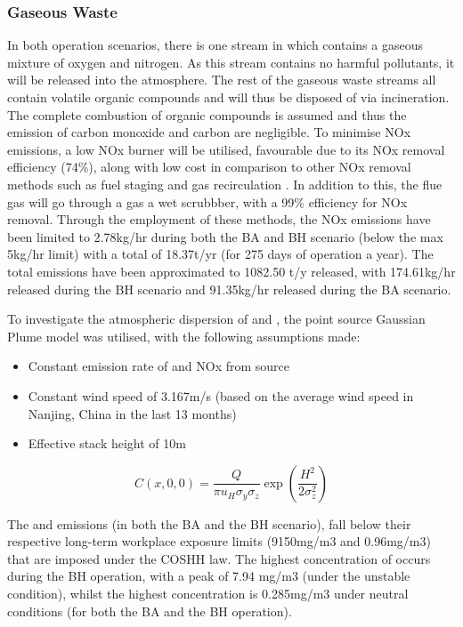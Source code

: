 
\subsubsection{Gaseous Waste}

In both operation scenarios, there is one stream in which contains a gaseous mixture of oxygen and nitrogen. As this stream contains no harmful pollutants, it will be released into the atmosphere. The rest of the gaseous waste streams all contain volatile organic compounds and will thus be disposed of via incineration. The complete combustion of organic compounds is assumed and thus the emission of carbon monoxide and carbon are negligible. To minimise NOx emissions, a low NOx burner will be utilised, favourable due to its NOx removal efficiency (74\%), along with low cost in comparison to other NOx removal methods such as fuel staging and gas recirculation \cite{world_bank_group_pollution_1999}. In addition to this, the flue gas will go through a gas a wet scrubbber, with a 99\% efficiency for NOx removal. Through the employment of these methods, the NOx emissions have been limited to 2.78kg/hr during both the BA and BH scenario (below the max 5kg/hr limit) with a total of 18.37t/yr (for 275 days of operation a year). The total  emissions have been approximated to 1082.50 t/y released, with 174.61kg/hr released during the BH scenario and 91.35kg/hr released during the BA scenario. %

To investigate the atmospheric dispersion of  and , the point source Gaussian Plume model was utilised, with the following assumptions made:

\begin{itemize}
\item Constant emission rate of  and NOx from source
\item Constant wind speed of 3.167m/s (based on the average wind speed in Nanjing, China in the last 13 months)
\item  Effective stack height of 10m 
\end{itemize}

\begin{equation}
C(x,0,0)= \frac{Q}{\pi u_{H} \sigma_{y} \sigma_{z}} \exp\left( \frac{H^2}{2\sigma_{z}^2}\right)
\end{equation}


The  and  emissions (in both the BA and the BH scenario), fall below their respective long-term workplace exposure limits (9150mg/m3 and 0.96mg/m3) that are imposed under the COSHH law. The highest concentration of  occurs during the BH operation, with a peak of 7.94 mg/m3  (under the unstable condition), whilst the highest  concentration is 0.285mg/m3 under neutral conditions (for both the BA and the BH operation). 

